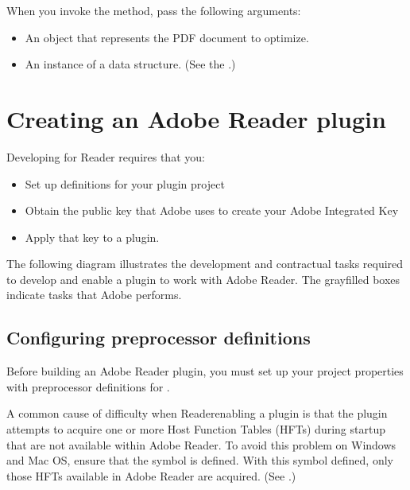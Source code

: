 \documentclass[letterpaper,12pt,english,openany,oneside]{sphinxmanual}
\begin{document}
When you invoke the  method, pass the following arguments:
\begin{itemize}
\item {} 
An  object that represents the PDF document to optimize.

\item {} 
An instance of a  data structure. (See the .)

\end{itemize}


\chapter{Creating an Adobe Reader plugin}
\label{\detokenize{Plugins_ReaderPlug:creating-an-adobe-reader-plugin}}\label{\detokenize{Plugins_ReaderPlug::doc}}
Developing for Reader requires that you:
\begin{itemize}
\item {} 
Set up definitions for your plugin project

\item {} 
Obtain the public key that Adobe uses to create your Adobe Integrated Key

\item {} 
Apply that key to a plugin.

\end{itemize}

The following diagram illustrates the development and contractual tasks required to develop and enable a plugin to work with Adobe Reader. The gray\sphinxhyphen{}filled boxes indicate tasks that Adobe performs.

\noindent{}


\section{Configuring preprocessor definitions}
\label{\detokenize{Plugins_ReaderPlug:configuring-preprocessor-definitions}}
Before building an Adobe Reader plugin, you must set up your project properties with preprocessor definitions for .

A common cause of difficulty when Reader\sphinxhyphen{}enabling a plugin is that the plugin attempts to acquire one or more Host Function Tables (HFTs) during startup that are not available within Adobe Reader. To avoid this problem on Windows and Mac OS, ensure that the  symbol is defined. With this symbol defined, only those HFTs available in Adobe Reader are acquired. (See .)
\end{document}
